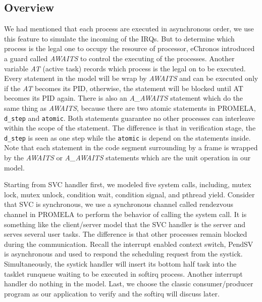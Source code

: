 \subsection{Overview}
We had mentioned that each process are executed in asynchronous order, we use this feature to simulate the incoming of the IRQs. But to determine which process is the legal one to occupy the resource of processor, eChronos introduced a guard called \textit{AWAITS} to control the executing of the processes. Another variable \textit{AT} (active task) records which process is the legal on to be executed. Every statement in the model will be wrap by \textit{AWAITS} and can be executed only if the \textit{AT} becomes its PID, otherwise, the statement will be blocked until AT becomes its PID again. There is also an \textit{A\_AWAITS} statement which do the same thing as \textit{AWAITS}, because there are two atomic statements in PROMELA, \texttt{d\_step} and \texttt{atomic}. Both statements guarantee no other processes can interleave within the scope of the statement. The difference is that in verification stage, the \texttt{d\_step} is seen as one step while the \texttt{atomic} is depend on the statements inside. Note that each statement in the code segment surrounding by a frame is wrapped by the \textit{AWAITS} or \textit{A\_AWAITS} statements which are the unit operation in our model.

Starting from SVC handler first, we modeled five system calls, including, mutex lock, mutex unlock, condition wait, condition signal, and pthread yield. Consider that SVC is synchronous, we use a synchronous channel called rendezvous channel in PROMELA to perform the behavior of calling the system call. It is something like the client/server model that the SVC handler is the server and serves several user tasks. The difference is that other processes remain blocked during the communication. Recall the interrupt enabled context switch, PendSV is asynchronous and used to respond the scheduling request from the systick. Simultaneously, the systick handler will insert its bottom half task into the tasklet runqueue waiting to be executed in softirq process. Another interrupt handler do nothing in the model. Last, we choose the classic consumer/producer program as our application to verify and the softirq will discuss later.

